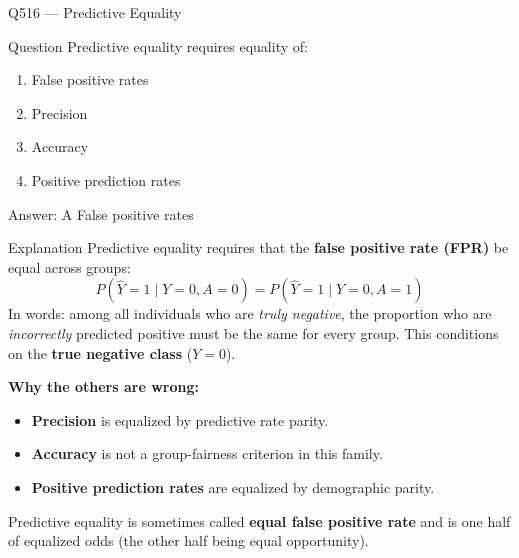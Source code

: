 \documentclass[aspectratio=169,8pt]{beamer}
\begin{document}
\begin{frame}{Q516 --- Predictive Equality}
	\begin{block}{Question}
		Predictive equality requires equality of:
		\begin{enumerate}
			\item False positive rates
			\item Precision
			\item Accuracy
			\item Positive prediction rates
		\end{enumerate}
	\end{block}
	\begin{exampleblock}{Answer: A}
		False positive rates
	\end{exampleblock}
	\begin{block}{Explanation}
		Predictive equality requires that the \textbf{false positive rate (FPR)}
		be equal across groups:
		\[
		P(\hat{Y} = 1 \mid Y = 0, A = 0) = P(\hat{Y} = 1 \mid Y = 0, A = 1)
		\]
		In words: among all individuals who are \emph{truly negative},
		the proportion who are \emph{incorrectly} predicted positive must be the
		same for every group. This conditions on the \textbf{true negative class}
		(\(Y = 0\)).
		
		\textbf{Why the others are wrong:}
		\begin{itemize}
			\item \textbf{Precision} is equalized by predictive rate parity.
			\item \textbf{Accuracy} is not a group-fairness criterion in this family.
			\item \textbf{Positive prediction rates} are equalized by demographic parity.
		\end{itemize}
		Predictive equality is sometimes called \textbf{equal false positive rate}
		and is one half of equalized odds (the other half being equal opportunity).
	\end{block}
\end{frame}
\end{document}
